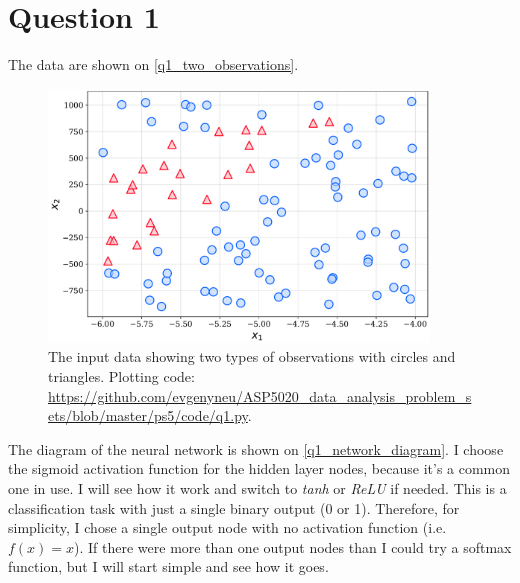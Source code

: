 \section{Question 1}

The data are shown on \autoref{q1_two_observations}.

\begin{figure}[H]
  \centering
  \includegraphics[width=0.9\textwidth]{figures/q1.pdf}
  \caption{The input data showing two types of observations with circles and triangles. Plotting code: \url{https://github.com/evgenyneu/ASP5020_data_analysis_problem_sets/blob/master/ps5/code/q1.py}.}
  \label{q1_two_observations}
\end{figure}

The diagram of the neural network is shown on \autoref{q1_network_diagram}. I choose the sigmoid activation function for the hidden layer nodes, because it's a common one in use. I will see how it work and switch to \emph{tanh} or \emph{ReLU} if needed. This is a classification task with just a single binary output (0 or 1). Therefore, for simplicity, I chose a single output node with no activation function (i.e. $f(x) = x$). If there were more than one output nodes than I could try a softmax function, but I will start simple and see how it goes.

